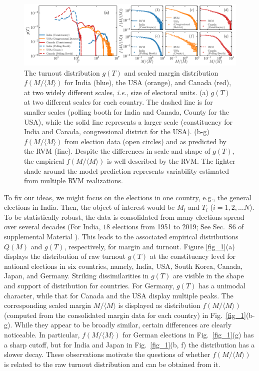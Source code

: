 \documentclass[reprint,aps,prl,showpacs,twocolumn, superscriptaddress]{revtex4-2}
\begin{document}
\begin{figure}[t]
    \centering
    \includegraphics[width=\textwidth]{fig_2.pdf}
    \caption{The turnout distribution $g(T)$ and scaled margin distribution $f(M/\langle M \rangle)$ for India (blue), the USA (orange), and Canada (red), at two widely different scales, {\it i.e.}, size of electoral units. (a) $g(T)$ at two different scales for each country. The dashed line is for smaller scales (polling booth for India and Canada, County for the USA), while the solid line represents a larger scale (constituency for India and Canada, congressional district for the USA). (b-g) $f(M/\langle M \rangle)$ from election data (open circles) and as predicted by the RVM (line). Despite the differences in scale and shape of $g(T)$, the empirical $f(M/\langle M \rangle)$ is well described by the RVM. The lighter shade around the model prediction represents variability estimated from multiple RVM realizations.}
    \label{fig_2}
\end{figure}

To fix our ideas, we might focus on the elections in one country, e.g., the general elections in India. Then, the object of interest would be $M_i$ and $T_i$ ($i=1,2, \dots N$). To be statistically robust, the data is consolidated from many elections spread over several decades (For India, $18$ elections from 1951 to 2019; See Sec.~S6 of supplemental Material \cite{supp})\nocite{abramowitz_stegun}. This leads to the associated empirical distributions $Q(M)$ and $g(T)$, respectively, for margin and turnout. Figure \ref{fig_1}(a) displays the distribution of raw turnout $g(T)$ at the constituency level for national elections in six countries, namely, India, USA, South Korea, Canada, Japan, and Germany. Striking dissimilarities in $g(T)$ are visible in the shape and support of distribution for countries. For Germany, $g(T)$ has a unimodal character, while that for Canada and the USA display multiple peaks. The corresponding scaled margin $M/\langle M \rangle$ is displayed as distribution $f(M/\langle M \rangle)$ (computed from the consolidated margin data for each country) in Fig.~\ref{fig_1}(b-g). While they appear to be broadly similar, certain differences are clearly noticeable. In particular, $f(M/\langle M \rangle)$ for German elections in Fig.~\ref{fig_1}(g) has a sharp cutoff, but for India and Japan in Fig.~\ref{fig_1}(b, f) the distribution has a slower decay. These observations motivate the questions of whether $f(M/\langle M \rangle)$ is related to the raw turnout distribution and can be obtained from it.
\end{document}

